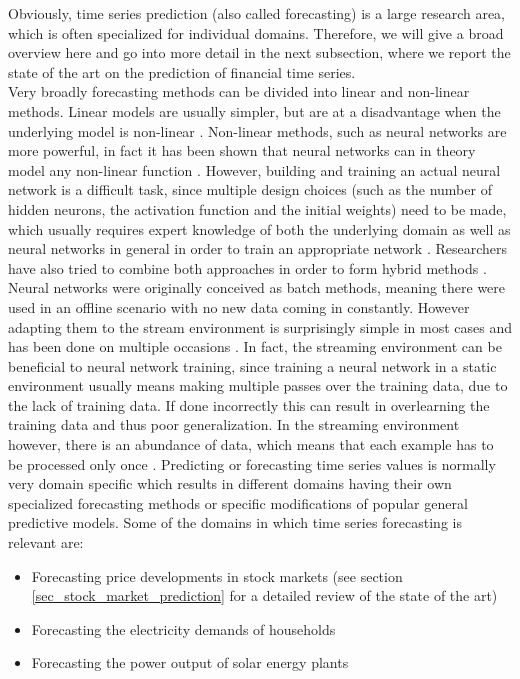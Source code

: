 Obviously, time series prediction (also called forecasting) is a large research area, which is often specialized for individual domains. Therefore, we will give a broad overview here and go into more detail in the next subsection, where we report the state of the art on the prediction of financial time series. \\
Very broadly forecasting methods can be divided into linear and non-linear methods. Linear models are usually simpler, but are at a disadvantage when the underlying model is non-linear \cite{zhang2003time}. Non-linear methods, such as neural networks are more powerful, in fact it has been shown that neural networks can in theory model any non-linear function \cite{abraham2005artificial} \cite{funahashi1989approximate}. However, building and training an actual neural network is a difficult task, since multiple design choices (such as the number of hidden neurons, the activation function and the initial weights) need to be made, which usually requires expert knowledge of both the underlying domain as well as neural networks in general in order to train an appropriate network \cite{abraham2005artificial}. Researchers have also tried to combine both approaches in order to form hybrid methods \cite{zhang2003time}. \newline
Neural networks were originally conceived as batch methods, meaning there were used in an offline scenario with no new data coming in constantly. However adapting them to the stream environment is surprisingly simple in most cases and has been done on multiple occasions \cite{chang2002real} \cite{frank2001time}. In fact, the streaming environment can be beneficial to neural network training, since training a neural network in a static environment usually means making multiple passes over the training data, due to the lack of training data. If done incorrectly this can result in overlearning the training data and thus poor generalization. In the streaming environment however, there is an abundance of data, which means that each example has to be processed only once \cite{gama2010knowledge}. \newline
Predicting or forecasting time series values is normally very domain specific which results in different domains having their own specialized forecasting methods or specific modifications of popular general predictive models. Some of the domains in which time series forecasting is relevant are:

\begin{itemize}
	\item Forecasting price developments in stock markets (see section \ref{sec_stock_market_prediction} for a detailed review of the state of the art)
	\item Forecasting the electricity demands of households \cite{veit2014household}
	\item Forecasting the power output of solar energy plants \cite{inman2013solar}
\end{itemize}


